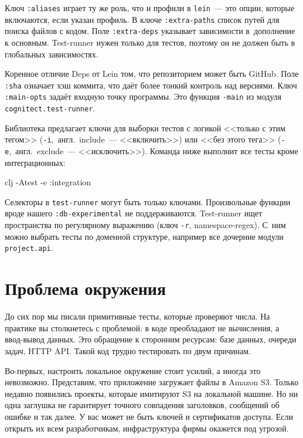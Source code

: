 Ключ \verb|:aliases| играет ту же роль, что и профили в \verb|lein|~--- это
опции, которые включаются, если указан профиль. В ключе \verb|:extra-paths|
список путей для поиска файлов с кодом. Поле \verb|:extra-deps| указывает
зависимости в~дополнение к основным. Test-runner нужен только для тестов,
поэтому он не должен быть в глобальных зависимостях.

Коренное отличие Deps от Lein том, что репозиторием может быть GitHub. Поле
\verb|:sha| означает хэш коммита, что даёт более тонкий контроль над
версиями. Ключ \verb|:main-opts| задаёт входную точку программы. Это функция
\verb|-main| из модуля \verb|cognitect.test-runner|.

Библиотека предлагает ключи для выборки тестов с логикой <<только с этим тегом>>
(\verb|-i|,~англ.~include~--- <<включить>>) или <<без этого тега>>
(\verb|-e|,~англ.~exclude~--- <<исключить>>). Команда ниже выполнит все тесты кроме
интеграционных:

\begin{english}
  \begin{bash}
clj -Atest -e :integration
  \end{bash}
\end{english}

Селекторы в \verb|test-runner| могут быть только ключами. Произвольные функции
вроде нашего \verb|:db-experimental| не поддерживаются. Test-runner ищет
пространства по регулярному выражению (ключ \verb|-r|, namespace-regex). С~ним
можно выбрать тесты по доменной структуре, например все дочерние модули
\verb|project.api|.

\section{Проблема окружения}


До сих пор мы писали примитивные тесты, которые проверяют числа. На практике вы
столкнетесь с проблемой: в коде преобладают не вычисления, а ввод-вывод
данных. Это обращение к сторонним ресурсам: базе данных, очереди задач, HTTP
API. Такой код трудно тестировать по двум причинам.


Во-первых, настроить локальное окружение стоит усилий, а иногда это
невозможно. Представим, что приложение загружает файлы в Amazon S3. Только
недавно появились проекты, которые имитируют S3 на локальной машине. Но ни одна
заглушка не гарантирует точного совпадения заголовков, сообщений об ошибке и так
далее. У вас может не быть ключей и сертификатов доступа. Если открыть их всем
разработчикам, инфраструктура фирмы окажется под угрозой.

